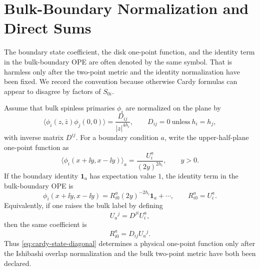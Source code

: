 \section{Bulk-Boundary Normalization and Direct Sums}
\label{sec:bcft-bulk-boundary-normalization-direct-sums}

The boundary state coefficient, the disk one-point function, and the
identity term in the bulk-boundary OPE are often denoted by the same symbol.
That is harmless only after the two-point metric and the identity
normalization have been fixed.  We record the convention because otherwise
Cardy formulas can appear to disagree by factors of \(S_{0i}\).

Assume that bulk spinless primaries \(\phi_i\) are normalized on the plane by
\begin{equation}
  \langle \phi_i(z,\bar z)\phi_j(0,0)\rangle
  =
  \frac{D_{ij}}{|z|^{4h_i}},
  \qquad
  D_{ij}=0\ \text{unless}\ h_i=h_j,
  \label{eq:bcft-bulk-two-point-metric}
\end{equation}
with inverse matrix \(D^{ij}\).  For a boundary condition \(a\), write the
upper-half-plane one-point function as
\begin{equation}
  \langle \phi_i(x+\ii y,x-\ii y)\rangle_a
  =
  \frac{U^a_i}{(2y)^{2h_i}},
  \qquad y>0 .
  \label{eq:bcft-disk-one-point-lowered}
\end{equation}
If the boundary identity \(\mathbf 1_a\) has expectation value \(1\), the
identity term in the bulk-boundary OPE is
\begin{equation}
  \phi_i(x+\ii y,x-\ii y)
  =
  R^a_{i0}(2y)^{-2h_i}\mathbf 1_a+\cdots ,
  \qquad
  R^a_{i0}=U^a_i .
  \label{eq:bcft-bulk-boundary-identity-coefficient}
\end{equation}
Equivalently, if one raises the bulk label by defining
\[
  U_a{}^j=D^{ji}U^a_i ,
\]
then the same coefficient is
\begin{equation}
  R^a_{i0}=D_{ij}U_a{}^j .
  \label{eq:bcft-r-u-one-point-relation}
\end{equation}
Thus \eqref{eq:cardy-state-diagonal} determines a physical one-point
function only after the Ishibashi overlap normalization and the bulk
two-point metric have both been declared.

